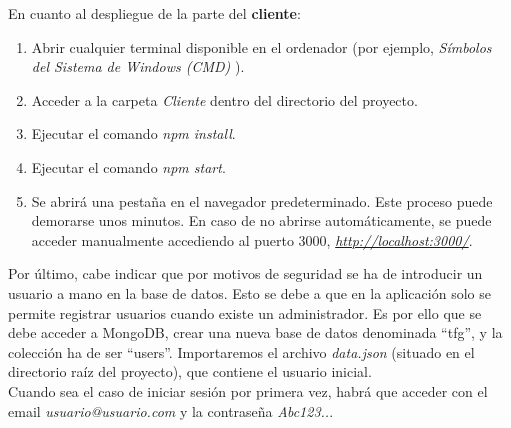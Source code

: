 En cuanto al despliegue de la parte del {\bf cliente}:
\begin{enumerate}
\item Abrir cualquier terminal disponible en el ordenador (por ejemplo, {\it Símbolos del Sistema de Windows (CMD)} \cite{cmd}).
\item Acceder a la carpeta {\it Cliente} dentro del directorio del proyecto.
\item Ejecutar el comando {\it npm install}.
\item Ejecutar el comando {\it npm start}.
\item Se abrirá una pestaña en el navegador predeterminado. Este proceso puede demorarse unos minutos. En caso de no abrirse automáticamente, se puede acceder manualmente accediendo al puerto 3000, {\it \url{http://localhost:3000/}}.
\end{enumerate}

Por último, cabe indicar que por motivos de seguridad se ha de introducir un usuario a mano en la base de datos. Esto se debe a que en la aplicación solo se permite registrar usuarios cuando existe un administrador. Es por ello que se debe acceder a MongoDB, crear una nueva base de datos denominada ``tfg'', y la colección ha de ser ``users''. Importaremos el archivo {\it data.json} (situado en el directorio raíz del proyecto), que contiene el usuario inicial.
\\

Cuando sea el caso de iniciar sesión por primera vez, habrá que acceder con el email {\it usuario@usuario.com} y la contraseña {\it Abc123..}.